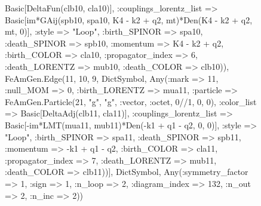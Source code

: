 \documentclass{revtex4}
\begin{document}
\begin{figure}[!htb]
\begin{center}
{Basic[DeltaFun(clb10, cla10)], :couplings_lorentz_list => Basic[im*GAij(spb10, spa10, K4 - k2 + q2, mt)*Den(K4 - k2 + q2, mt, 0)], :style => "Loop", :birth_SPINOR => spa10, :death_SPINOR => spb10, :momentum => K4 - k2 + q2, :birth_COLOR => cla10, :propagator_index => 6, :death_LORENTZ => mub10, :death_COLOR => clb10)), FeAmGen.Edge(11, 10, 9, Dict{Symbol, Any}(:mark => 11, :null_MOM => 0, :birth_LORENTZ => mua11, :particle => FeAmGen.Particle(21, "g", "g", :vector, :octet, 0//1, 0, 0), :color_list => Basic[DeltaAdj(clb11, cla11)], :couplings_lorentz_list => Basic[-im*LMT(mua11, mub11)*Den(-k1 + q1 - q2, 0, 0)], :style => "Loop", :birth_SPINOR => spa11, :death_SPINOR => spb11, :momentum => -k1 + q1 - q2, :birth_COLOR => cla11, :propagator_index => 7, :death_LORENTZ => mub11, :death_COLOR => clb11))], Dict{Symbol, Any}(:symmetry_factor => 1, :sign => 1, :n_loop => 2, :diagram_index => 132, :n_out => 2, :n_inc => 2)) 
}
\end{center}
\end{figure}
\end{document}
